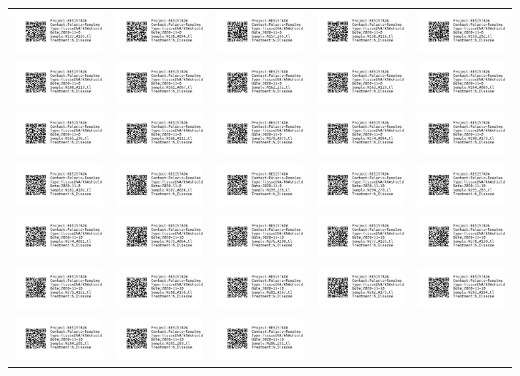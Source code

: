 \documentclass[10pt,notitlepage,letterpaper]{article}
\def\s{\phantom{xx}}
\def\w{1.27in}
\def\h{-0.030in}
\begin{document}
\begin{tabular}[t]{ c @{\s} c @{\s} c @{\s} c @{\s} c }
 \\[\h]
\includegraphics[width=\w]{label_N137_A195_Cl} & \includegraphics[width=\w]{label_N138_A094_Cl} & \includegraphics[width=\w]{label_N157_265_Cl} & \includegraphics[width=\w]{label_N158_A116_Cl} & \includegraphics[width=\w]{label_N159_202_Cl} \\[\h]
\includegraphics[width=\w]{label_N160_A119_Cl} & \includegraphics[width=\w]{label_N161_A067_Cl} & \includegraphics[width=\w]{label_N162_232_Cl} & \includegraphics[width=\w]{label_N163_A129_Cl} & \includegraphics[width=\w]{label_N164_A089_Cl} \\[\h]
\includegraphics[width=\w]{label_N165_296_Cl} & \includegraphics[width=\w]{label_N166_A111_Cl} & \includegraphics[width=\w]{label_N170_A075_Cl} & \includegraphics[width=\w]{label_N174_A084_Cl} & \includegraphics[width=\w]{label_N180_A179_Cl} \\[\h]
\includegraphics[width=\w]{label_N181_A102_Cl} & \includegraphics[width=\w]{label_N187_A024_Cl} & \includegraphics[width=\w]{label_N193_238_Cl} & \includegraphics[width=\w]{label_N294_270_Cl} & \includegraphics[width=\w]{label_N295_285_Cl} \\[\h]

\includegraphics[width=\w]{label_N274_A011_Cl} & \includegraphics[width=\w]{label_N275_A064_Cl} & \includegraphics[width=\w]{label_N276_A100_Cl} & \includegraphics[width=\w]{label_N277_A125_Cl} & \includegraphics[width=\w]{label_N278_A130_Cl} \\[\h]
\includegraphics[width=\w]{label_N279_A152_Cl} & \includegraphics[width=\w]{label_N280_A158_Cl} & \includegraphics[width=\w]{label_N281_A167_Cl} & \includegraphics[width=\w]{label_N282_A175_Cl} & \includegraphics[width=\w]{label_N283_A184_Cl} \\[\h]
\includegraphics[width=\w]{label_N284_201_Cl} & \includegraphics[width=\w]{label_N285_289_Cl} & \includegraphics[width=\w]{label_N286_291_Cl} & \includegraphics[width=\w]
\end{tabular}
\end{document}
